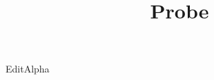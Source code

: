 \documentclass[9pt,aspectratio=169]{beamer}
\title{Probe}
\newcommand{\editprobetext}{EditAlpha}
\begin{document}
\begin{frame}\centering \editprobetext\par \titlepage\end{frame}
\end{document}
